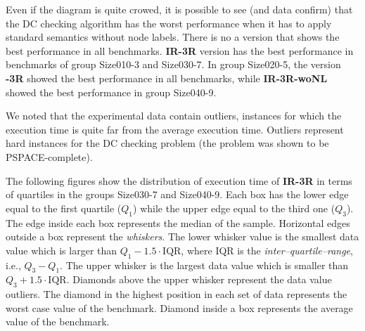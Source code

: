 \documentclass[a4paper,11pt]{article}
\begin{document}
Even if the diagram is quite crowed, it is possible to see (and data confirm) that the DC checking algorithm has the worst performance when it has to 
apply standard semantics without node labels. There is no a version that shows the best performance in all benchmarks. \textbf{IR-3R} version has the best performance in benchmarks of group Size010-3 and Size030-7.
In group Size020-5, the version \textbf{\textepsilon-3R} showed the best performance in all benchmarks, while \textbf{IR-3R-woNL} showed the best performance in group Size040-9.

We noted that the experimental data contain outliers, instances for which the execution time is quite far from the average execution time.
Outliers represent hard instances for the DC checking problem (the problem was shown to be PSPACE-complete).

The following figures show the distribution of execution time of \textbf{IR-3R} in terms of quartiles in the groups Size030-7 and Size040-9. 
Each box has the lower edge equal to the first quartile ($Q_1$) while the upper edge equal to the third one ($Q_3$).
The edge inside each box represents the median of the sample.
Horizontal edges outside a box represent the \textit{whiskers}. The lower whisker value is the smallest data value which is larger than $Q_1-1.5\cdot \mathrm{IQR}$, where IQR is the \textit{inter–quartile–range}, i.e.,  $Q_3-Q_1$. The upper whisker is the largest data value which is smaller than $Q_3+1.5\cdot \mathrm{IQR}$. 
Diamonds above the upper whisker represent the data value outliers. 	The diamond in the highest position in each set of data represents the worst case value of the benchmark. Diamond inside a box represents the average value of the benchmark.
\smallskip
\end{document}
